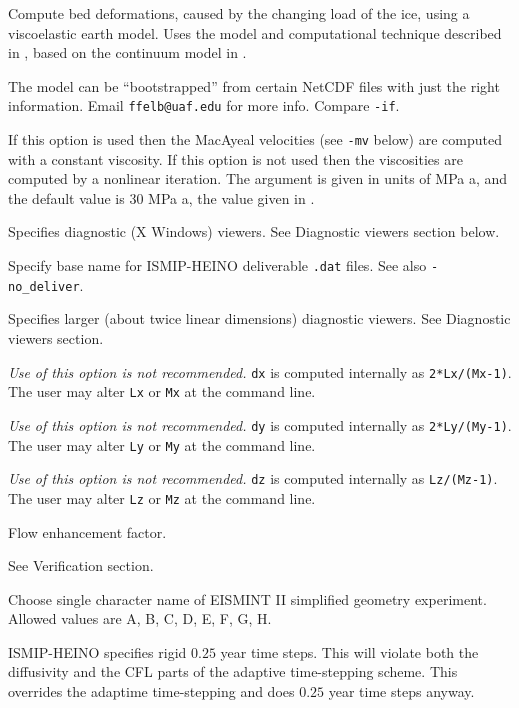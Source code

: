 \documentclass[11pt,final]{amsart}
\begin{document}
 Compute bed deformations, caused by the changing load of the ice, using a viscoelastic earth model.  Uses the model and computational technique described in \cite{BLKfastearth}, based on the continuum model in \cite{LingleClark}.

  The model can be ``bootstrapped'' from certain NetCDF files with just the right information.  Email \verb|ffelb@uaf.edu| for more info.  Compare \verb|-if|.

  If this option is used then the MacAyeal velocities (see \verb|-mv| below) are computed with a constant viscosity.  If this option is not used then the viscosities are computed by a nonlinear iteration.  The argument is given in units of MPa a, and the default value is $30$ MPa a, the value given in \cite{Ritzetal2001}.

  Specifies diagnostic (X Windows) viewers.  See Diagnostic viewers section below.

  Specify base name for ISMIP-HEINO deliverable \verb|.dat| files.  See also \verb|-no_deliver|.

  Specifies larger (about twice linear dimensions) diagnostic viewers.  See Diagnostic viewers section.

  \emph{Use of this option is not recommended.}  \verb|dx| is computed internally as \verb|2*Lx/(Mx-1)|.  The user may alter \verb|Lx| or \verb|Mx| at the command line.

  \emph{Use of this option is not recommended.}  \verb|dy| is computed internally as \verb|2*Ly/(My-1)|.  The user may alter \verb|Ly| or \verb|My| at the command line.

  \emph{Use of this option is not recommended.}  \verb|dz| is computed internally as \verb|Lz/(Mz-1)|.  The user may alter \verb|Lz| or \verb|Mz| at the command line.

  Flow enhancement factor.

  See Verification section.

  Choose single character name of EISMINT II \cite{EISMINT00} simplified geometry experiment.  Allowed values are A, B, C, D, E, F, G, H.

  ISMIP-HEINO specifies rigid $0.25$ year time steps.  This will violate both the diffusivity and the CFL parts of the adaptive time-stepping scheme.  This overrides the adaptime time-stepping and does $0.25$ year time steps anyway.
\end{document}
